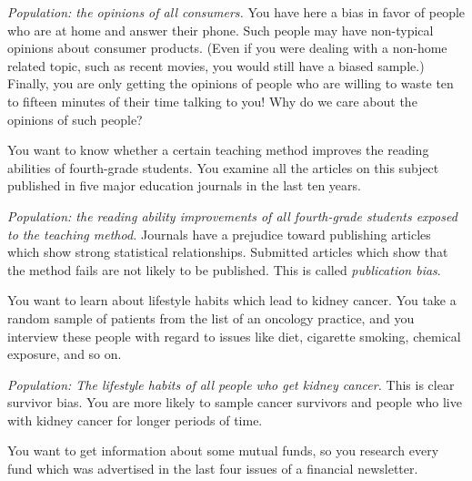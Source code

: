 \documentclass[11pt]{exam}
\begin{document}
\begin{questions}
 \begin{solution}
 \textit{Population: the opinions of all consumers.}
 You have here a bias in favor of people who are at home and answer their
 phone. Such people may have non-typical opinions about consumer products.
 (Even if you were dealing with a non-home related topic, such as recent
 movies, you would still have a biased sample.) Finally, you are only getting
 the opinions of people who are willing to waste ten to fifteen minutes of
 their time talking to you! Why do we care about the opinions of such people?
 \end{solution}
 
 
 
 
 \question You want to know whether a certain teaching method improves the reading
 abilities of fourth-grade students.  You examine all the articles on this
 subject published in five major education journals in the last ten years.
 
 \begin{solution}
 \textit{Population: the reading ability improvements of all fourth-grade
 students exposed to the teaching method.}
 Journals have a prejudice toward publishing articles which show strong
 statistical relationships. Submitted articles which show that the method fails
 are not likely to be published. This is called \emph{publication bias}.
 \end{solution}
 
 
 
 
 \question You want to learn about lifestyle habits which lead to kidney cancer.   You
 take a random sample of patients from the list of an oncology practice, and
 you interview these people with regard to issues like diet, cigarette smoking,
 chemical exposure, and so on.
 
 \begin{solution}
 \textit{Population: The lifestyle habits of all people who get kidney cancer.}
 This is clear survivor bias.  You are more likely to sample cancer survivors
 and people who live with kidney cancer for longer periods of time.
 \end{solution}
 
 
 
 \question You want to get information about some mutual funds, so you research every
 fund which was advertised in the last four issues of a financial newsletter.
 

\end{questions}
\end{document}

